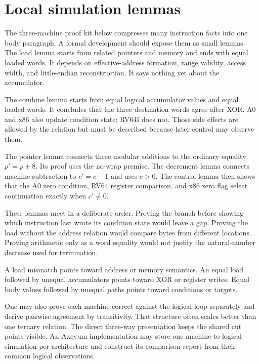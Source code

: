 \section{Local simulation lemmas}

The three-machine proof kit below compresses many instruction facts into one
body paragraph. A formal development should expose them as small lemmas. The
load lemma starts from related pointers and memory and ends with equal loaded
words. It depends on effective-address formation, range validity, access width,
and little-endian reconstruction. It says nothing yet about the accumulator.

The combine lemma starts from equal logical accumulator values and equal
loaded words. It concludes that the three destination words agree after XOR.
A0 and x86 also update condition state; RV64I does not. Those side effects are
allowed by the relation but must be described because later control may
observe them.

The pointer lemma connects three modular additions to the ordinary equality
\(p'=p+8\). Its proof uses the no-wrap premise. The decrement lemma connects
machine subtraction to \(c'=c-1\) and uses \(c>0\). The control lemma then
shows that the A0 zero condition, RV64 register comparison, and x86 zero flag
select continuation exactly when \(c'\ne0\).

These lemmas meet in a deliberate order. Proving the branch before showing
which instruction last wrote its condition state would leave a gap. Proving
the load without the address relation would compare bytes from different
locations. Proving arithmetic only as a word equality would not justify the
natural-number decrease used for termination.

\begin{sidebar}[title={Small lemmas localize a counterexample}]
A load mismatch points toward address or memory semantics. An equal load
followed by unequal accumulators points toward XOR or register writes. Equal
body values followed by unequal paths points toward conditions or targets.
\end{sidebar}

One may also prove each machine correct against the logical loop separately
and derive pairwise agreement by transitivity. That structure often scales
better than one ternary relation. The direct three-way presentation keeps the
shared cut points visible. An Axeyum implementation may store one
machine-to-logical simulation per architecture and construct its comparison
report from their common logical observations.

